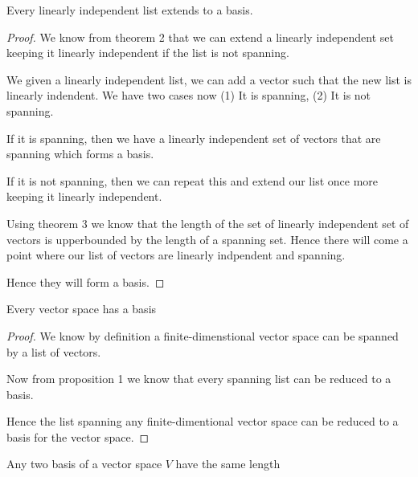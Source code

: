 \begin{prop}
    Every linearly independent list extends to a basis.
\end{prop}

    \begin{proof}
        We know from theorem 2 that we can extend a linearly independent set keeping it linearly independent if the list is not spanning.

        We given a linearly independent list, we can add a vector such that the new list is linearly indendent. We have two cases now (1) It is spanning, (2) It is not spanning.

        If it is spanning, then we have a linearly independent set of vectors that are spanning which forms a basis.

        If it is not spanning, then we can repeat this and extend our list once more keeping it linearly independent.

        Using theorem 3 we know that the length of the set of linearly independent set of vectors is upperbounded by the length of a spanning set. Hence there will come a point where our list of vectors are linearly indpendent and spanning.

        Hence they will form a basis.
    \end{proof}

\begin{theorem}
    Every vector space has a basis
\end{theorem}

    \begin{proof}
        We know by definition a finite-dimenstional vector space can be spanned by a list of vectors.

        Now from proposition 1 we know that every spanning list can be reduced to a basis.

        Hence the list spanning any finite-dimentional vector space can be reduced to a basis for the vector space.
    \end{proof}

\begin{theorem}
    Any two basis of a vector space $V$ have the same length
\end{theorem}


